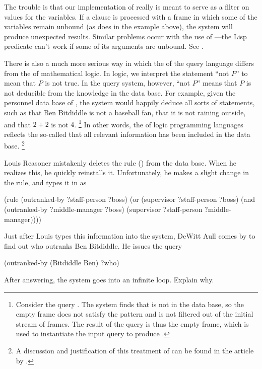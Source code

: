 The trouble is that our implementation of  really is meant to serve as a filter on values for the variables.
If a  clause is processed with a frame in which some of the variables remain unbound (as does  in the example above), the system will produce unexpected results.
Similar problems occur with the use of ---the Lisp predicate can’t work if some of its arguments are unbound.
See .

There is also a much more serious way in which the  of the query language differs from the  of mathematical logic.
In logic, we interpret the statement “not \( P \)” to mean that \( P \) is not true.
In the query system, however, “not \( P \)” means that \( P \) is not deducible from the knowledge in the data base.
For example, given the personnel data base of , the system would happily deduce all sorts of  statements, such as that Ben Bitdiddle is not a baseball fan, that it is not raining outside, and that \( 2 + 2 \) is not \( 4 \).%
\footnote{
	Consider the query .
	The system finds that  is not in the data base, so the empty frame does not satisfy the pattern and is not filtered out of the initial stream of frames.
	The result of the query is thus the empty frame, which is used to instantiate the input query to produce .
}
In other words, the  of logic programming languages reflects the so-called  that all relevant information has been included in the data base.%
\footnote{
	A discussion and justification of this treatment of  can be found in the article by \autocite{clark_negation_as_failure}.
}



\begin{exercise}
	\label{Exercise 4.64}
	Louis Reasoner mistakenly deletes the  rule () from the data base.
	When he realizes this, he quickly reinstalls it.
	Unfortunately, he makes a slight change in the rule, and types it in as
	\begin{scheme}
	  (rule (outranked-by ?staff-person ?boss)
	        (or (supervisor ?staff-person ?boss)
	            (and (outranked-by ?middle-manager ?boss)
	                 (supervisor ?staff-person
	                             ?middle-manager))))
	\end{scheme}
	Just after Louis types this information into the system, DeWitt Aull comes by
	to find out who outranks Ben Bitdiddle. He issues the query
	\begin{scheme}
	  (outranked-by (Bitdiddle Ben) ?who)
	\end{scheme}
	After answering, the system goes into an infinite loop.  Explain why.
\end{exercise}



